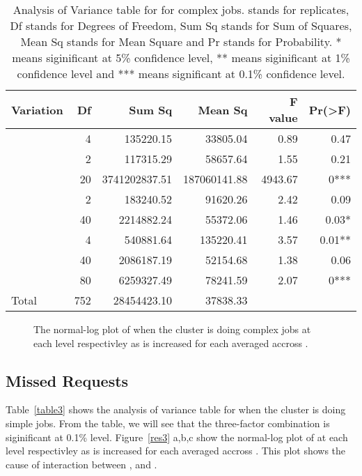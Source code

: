 \documentclass[preprint]{acm_proc_article-sp}
\begin{document}
\begin{table*}
	\caption{Analysis of Variance table for  for complex jobs.  stands for replicates, Df stands for Degrees of Freedom, Sum Sq stands for Sum of Squares, Mean Sq stands for Mean Square and Pr stands for Probability. * means siginificant at 5\% confidence level, ** means siginificant at 1\% confidence level and *** means significant at 0.1\% confidence level.}
	\label{table2}
	\centering
	\begin{tabular}{l|rrrrr}
		\hline\hline
		Variation&Df&Sum Sq&Mean Sq&F value&Pr(>F)\\
		\hline
		&4&135220.15&33805.04&0.89&0.47\\
		&2&117315.29&58657.64&1.55&0.21\\
		&20&3741202837.51&187060141.88&4943.67&0***\\
		&2&183240.52&91620.26&2.42&0.09\\
		&40&2214882.24&55372.06&1.46&0.03*\\
		&4&540881.64&135220.41&3.57&0.01**\\
		&40&2086187.19&52154.68&1.38&0.06\\
		&80&6259327.49&78241.59&2.07&0***\\
		\hline
		Total&752&28454423.10&37838.33\\
		\hline\hline
	\end{tabular}
\end{table*}

\begin{figure*}[htb]
        \centering
{}
        \caption{The normal-log plot of  when the cluster is doing complex jobs at each  level respectivley as  is increased for each  averaged accross .}
        \label{res2}
\end{figure*}


\subsection{Missed Requests}
Table~\ref{table3} shows the analysis of variance table for  when the cluster is doing simple jobs. From the table, we will see that the three-factor combination  is siginificant at 0.1\% level. Figure~\ref{res3} a,b,c show the normal-log plot of  at each  level respectivley as  is increased for each  averaged accross . This plot shows the cause of interaction between ,  and .
\end{document}

